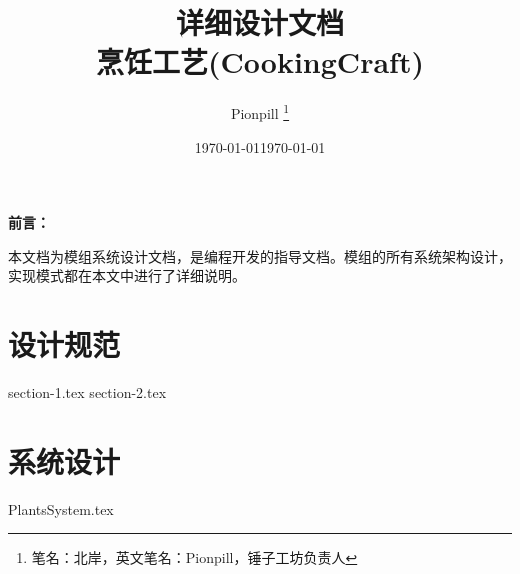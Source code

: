 \documentclass{PionpillNote-book}
\title{\Huge{详细设计文档} \\ \large{烹饪工艺(CookingCraft)}}
\author{
    Pionpill \footnote{笔名：北岸，英文笔名：Pionpill，锤子工坊负责人} \\
}
\date{\today}
\begin{document}
\pagestyle{plain}

\maketitle

\noindent\textbf{前言：}

本文档为模组系统设计文档，是编程开发的指导文档。模组的所有系统架构设计，实现模式都在本文中进行了详细说明。

\date{\today}
\tableofcontents
\newpage

\setcounter{page}{1} 
\pagestyle{fancy}

\chapter{设计规范}
{section-1.tex}
{section-2.tex}
\chapter{系统设计}
{PlantsSystem.tex}
\end{document}
